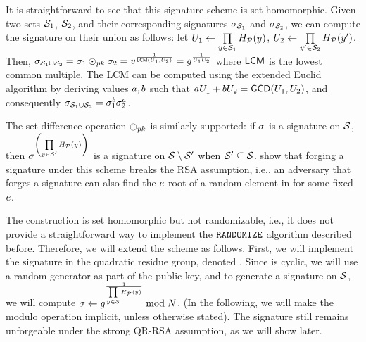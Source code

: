 It is straightforward to see that this signature 
scheme is set homomorphic. Given two sets $\genericSetVar[1]$, $\genericSetVar[2]$, and their 
corresponding signatures 
$\genericSig[\genericSetVar[1]]$ 
and $\genericSig[\genericSetVar[2]]$, we can compute the signature on their union as follows: let 
$\accSet[1] \gets 
\prod\limits_{\genericCInputElmt \in \genericSetVar[1]} \primeRO(\genericCInputElmt)$, $\accSet[2] \gets 
\prod\limits_{\genericCInputElmt' \in \genericSetVar[2]}  \primeRO(\genericCInputElmt')$. Then,  
$\genericSig[\genericSetVar[1] \cup \genericSetVar[2]] = \genericSig[1] 
\sigHomomorphism[\pubKey] \genericSig[2] = \genericRSAElmt^{\frac{1}{\lcm(\accSet[1],\accSet[2])}} 
= \qrGen^{\frac{1}{\accSet[1] \accSet[2]}}$ where $\mathsf{LCM}$ is the lowest common 
multiple. The LCM can be computed using the extended Euclid algorithm 
by deriving values $\euclideanConst[1], \euclideanConst[2]$ such that  
	$\euclideanConst[1]\accSet[1] + \euclideanConst[2] \accSet[2] = \gcd(\accSet[1], \accSet[2])$, and 
	consequently $\genericSig[\genericSetVar[1] \cup \genericSetVar[2]]  = 
	\genericSig[1]^{\euclideanConst[2]}  \genericSig[2]^{\euclideanConst[1]}$. 
	
	
	The set difference operation $\sigMinus[\pubKey]$ is similarly supported: 
	if $\genericSig$ is a signature on $\genericSetVar$, then 
	$\genericSig^{\left(\prod\limits_{\genericCInputElmt \in \genericSetVarAlt} 
	\primeRO(\genericCInputElmt)\right)}$ is a signature on $\genericSetVar \setminus 
		\genericSetVarAlt$ when $\genericSetVarAlt \subseteq \genericSetVar$. 
	\citet{johnson2002homomorphic} show that forging a signature 
	under this scheme breaks the RSA assumption, i.e., an adversary that forges a signature 
	can also find the $e$-root of a random element in \integersModNInv for some fixed 
	$e$. 
       \fi 
        

\newcommand{\equivClass}[2]{\ensuremath{\left\lbrack#1\right\rbrack_{#2}}\xspace}

\iffalse
{}
%
The construction is set homomorphic but not randomizable, 
i.e., it does not provide a straightforward way to implement the $\randomize$ algorithm described before. 
Therefore, we will extend the scheme as follows. First, we will implement the signature in the quadratic residue group, denoted \qrGroup. Since \qrGroup is cyclic, 
we will use a random generator 
\qrGen as part of the public key, and to generate a signature on $\genericSetVar$, we will compute 
$\genericSig \gets \qrGen^{\frac{1}{\prod\limits_{\genericCInputElmt \in 
\genericSetVar}\primeRO(\genericCInputElmt)}} \bmod \rsaMod$. (In the following, we 
will make the modulo operation implicit, unless otherwise stated). 
The signature still remains unforgeable under the strong 
QR-RSA assumption, as we will show later. 

